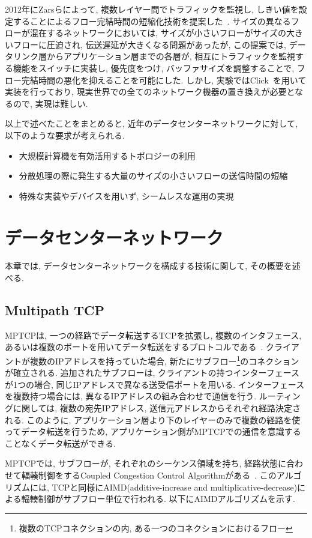 \documentclass[10pt, a4paper, twocolumn]{jsarticle}
\begin{document}
2012年にZarsらによって, 複数レイヤー間でトラフィックを監視し,
しきい値を設定することによるフロー完結時間の短縮化技術を提案した~\cite{detail}.
サイズの異なるフローが混在するネットワークにおいては, サイズが小さいフローがサイズの大きいフローに圧迫され,
伝送遅延が大きくなる問題があったが, この提案では, データリンク層からアプリケーション層までの各層が, 相互にトラフィックを監視する機能をスイッチに実装し,
優先度をつけ, バッファサイズを調整することで, フロー完結時間の悪化を抑えることを可能にした.
しかし, 実験ではClick~\cite{click}を用いて実装を行っており, 現実世界での全てのネットワーク機器の置き換えが必要となるので, 実現は難しい.

以上で述べたことをまとめると, 近年のデータセンターネットワークに対して, 以下のような要求が考えられる.
\begin{itemize}
  \item 大規模計算機を有効活用するトポロジーの利用
  \item 分散処理の際に発生する大量のサイズの小さいフローの送信時間の短縮
  \item 特殊な実装やデバイスを用いず, シームレスな運用の実現
\end{itemize}

\section{データセンターネットワーク}
\label{sec:datacenter}
本章では, データセンターネットワークを構成する技術に関して, その概要を述べる.
\subsection{Multipath TCP}
MPTCPは, 一つの経路でデータ転送するTCPを拡張し, 複数のインタフェース,
あるいは複数のポートを用いてデータ転送をするプロトコルである~\cite{mptcp}.
クライアントが複数のIPアドレスを持っていた場合, 新たにサブフロー\footnote{複数のTCPコネクションの内,
ある一つのコネクションにおけるフロー}のコネクションが確立される.
追加されたサブフローは, クライアントの持つインターフェースが1つの場合, 同じIPアドレスで異なる送受信ポートを用いる.
インターフェースを複数持つ場合には, 異なるIPアドレスの組み合わせで通信を行う.
ルーティングに関しては, 複数の宛先IPアドレス, 送信元アドレスからそれぞれ経路決定される.
このように, アプリケーション層より下のレイヤーのみで複数の経路を使ってデータ転送を行うため,
アプリケーション側がMPTCPでの通信を意識することなくデータ転送ができる.

MPTCPでは, サブフローが, それぞれのシーケンス領域を持ち, 経路状態に合わせて輻輳制御をするCoupled Congestion Control
Algorithmがある~\cite{cong}.
このアルゴリズムには, TCPと同様にAIMD(additive-increase and
multiplicative-decrease)による輻輳制御がサブフロー単位で行われる.
以下にAIMDアルゴリズムを示す.
\end{document}
